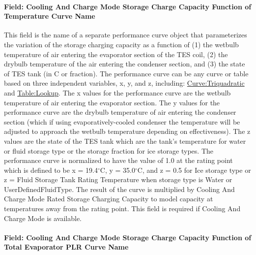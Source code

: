 \paragraph{Field: Cooling And Charge Mode Storage Charge Capacity Function of Temperature Curve Name}\label{field-cooling-and-charge-mode-storage-charge-capacity-function-of-temperature-curve-name}

This field is the name of a separate performance curve object that parameterizes the variation of the storage charging capacity as a function of (1) the wetbulb temperature of air entering the evaporator section of the TES coil, (2) the drybulb temperature of the air entering the condenser section, and (3) the state of TES tank (in C or fraction). The performance curve can be any curve or table based on three independent variables, x, y, and z, including: \hyperref[curvetriquadratic]{Curve:Triquadratic} and \hyperref[tablelookup]{Table:Lookup}. The x values for the performance curve are the wetbulb temperature of air entering the evaporator section. The y values for the performance curve are the drybulb temperature of air entering the condenser section (which if using evaporatively-cooled condenser the temperature will be adjusted to approach the wetbulb temperature depending on effectiveness). The z values are the state of the TES tank which are the tank's temperature for water or fluid storage type or the storage fraction for ice storage types. The performance curve is normalized to have the value of 1.0 at the rating point which is defined to be x = 19.4$^\circ$C, y = 35.0$^\circ$C, and z = 0.5 for Ice storage type or z = Fluid Storage Tank Rating Temperature when storage type is Water or UserDefinedFluidType. The result of the curve is multiplied by Cooling And Charge Mode Rated Storage Charging Capacity to model capacity at temperatures away from the rating point. This field is required if Cooling And Charge Mode is available.

\paragraph{Field: Cooling And Charge Mode Storage Charge Capacity Function of Total Evaporator PLR Curve Name}\label{field-cooling-and-charge-mode-storage-charge-capacity-function-of-total-evaporator-plr-curve-name}


